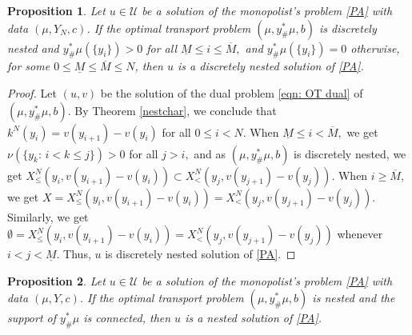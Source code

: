 \documentclass[12pt,reqno]{amsart}
\newtheorem{prop}{Proposition}
\begin{document}
\begin{prop}\label{OT to PA discrete}
     Let $u\in\mathcal{U}$ be a solution of the monopolist's problem \eqref{PA} with data $(\mu,Y_N,c)$. If the optimal transport problem $(\mu,y^*_\#\mu,b)$ is discretely nested and $y^*_\#\mu(\{y_i\})>0$ for all $\underline{M}\le i\le \overline{M},$ and \(y^*_\#\mu(\{y_i\}) = 0\) otherwise, for some $0\le \underline{M}\le \overline{M}\le N$, then $u$ is a discretely nested solution of \eqref{PA}.
\end{prop}
\begin{proof}
    Let $(u,v)$ be the solution of the dual problem \eqref{eqn: OT dual} of $(\mu,y^*_\#\mu,b).$  By Theorem \ref{nestchar}, we conclude that $k^N(y_i)=v(y_{i+1})-v(y_i)$ for all $0\le i<N.$ When  $\underline{M}\le i<\overline{M},$ we get $\nu(\{y_{k}:\, i< k\le j\})>0$ for all $j>i,$ and as $(\mu,y^*_\#\mu,b)$ is discretely nested, we get $X_{\le}^N(y_{i},v(y_{i+1})-v(y_i))\subset X_{<}^N(y_{j},v(y_{j+1})-v(y_j)).$ When $i\ge \overline{M},$ we get $X=X_{\le}^N(y_{i},v(y_{i+1})-v(y_i))= X_{<}^N(y_{j},v(y_{j+1})-v(y_j)).$ Similarly, we get $\emptyset=X_{\le}^N(y_{i},v(y_{i+1})-v(y_i))= X_{<}^N(y_{j},v(y_{j+1})-v(y_j))$ whenever $i<j<\underline{M}.$ Thus, $u$ is discretely nested solution of \eqref{PA}.
\end{proof}

\begin{prop}\label{OT to PA}
    Let $u\in\mathcal{U}$ be a solution of the monopolist's problem \eqref{PA} with data $(\mu,Y,c)$. If the optimal transport problem $(\mu,y^*_\#\mu,b)$ is nested and the support of $y^*_\#\mu$ is connected, then $u$ is a nested solution of \eqref{PA}.
\end{prop}
\end{document}
